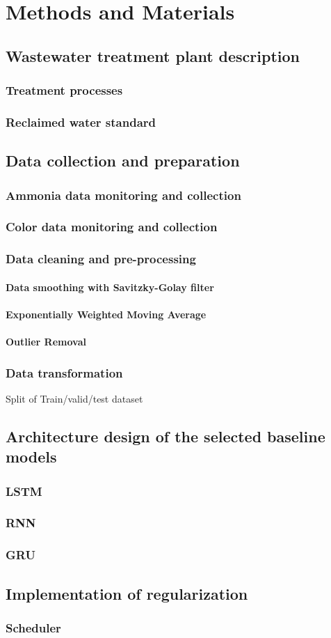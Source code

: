 \chapter{Methods and Materials}
\section{Wastewater treatment plant description}
\subsection{Treatment processes}
\subsection{Reclaimed water standard }
\section{Data collection and preparation}
\subsection{Ammonia data monitoring and collection}
\subsection{Color data monitoring and collection}
\subsection{Data cleaning and pre-processing}
\subsubsection{Data smoothing with Savitzky-Golay filter}
\subsubsection{Exponentially Weighted Moving Average}
\subsubsection{Outlier Removal}
\subsection{Data transformation}
Split of Train/valid/test dataset 
\section{Architecture design of the selected baseline models}
\subsection{LSTM}
\subsection{RNN}
\subsection{GRU}
\section{Implementation of regularization}
\subsection{Scheduler}
